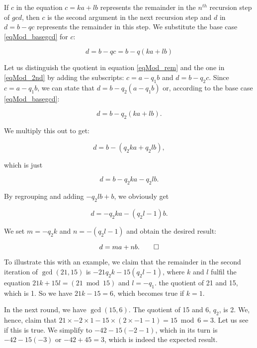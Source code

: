 \documentclass{scrreprt}
\begin{document}
If $c$ in the equation $c = ka + lb$
represents the remainder in the $n^{th}$ 
recursion step of $gcd$, then $c$
is the second argument in the next 
recursion step and $d$ in $d = b - qc$
represents the remainder in this step.
We substitute the base case 
\ref{eqMod_basegcd} for $c$:

\begin{equation}\label{eqMod_2nd}
d = b - qc = b - q(ka + lb)
\end{equation} 

Let us distinguish the quotient in equation \ref{eqMod_rem}
and the one in \ref{eqMod_2nd} by adding the subscripts:
$c = a - q_1b$ and $d = b - q_2c$.
Since $c = a - q_1b$, we can state that $d = b - q_2(a - q_1b)$
or, according to the base case \ref{eqMod_basegcd}: 

\begin{equation}
d = b - q_2(ka + lb).
\end{equation}

We multiply this out to get:

\begin{equation}
d = b - (q_2ka + q_2lb),
\end{equation}

which is just

\begin{equation}
d = b - q_2ka - q_2lb.
\end{equation}

By regrouping and adding $-q_2lb + b$, we obviously get

\begin{equation}\label{eqMod_mandn}
d = -q_2ka - (q_2l-1)b.
\end{equation}

We set $m = -q_2k$ and $n = -(q_2l-1)$
and obtain the desired result:

\begin{equation}
d = ma + nb.\qed
\end{equation}

To illustrate this with an example,
we claim that the remainder in the second 
iteration of $\gcd(21,15)$ is
$-21q_2k - 15(q_2l - 1)$,
where $k$ and $l$ fulfil the equation
$21k + 15l = (21 \bmod 15)$ and $l = -q_1$.
the quotient of 21 and 15, which is 1.
So we have
$21k - 15 = 6$, which becomes true if $k=1$.

In the next round, we have $\gcd(15,6)$.
The quotient of 15 and 6, $q_2$, is 2.
We, hence, claim that
$21 \times -2 \times 1 - 15 \times (2 \times -1  - 1) = 15 \bmod 6 = 3$. 
Let us see if this is true. We simplify to
$-42 - 15(-2 - 1)$, which in its turn is
$-42 - 15(-3)$ or $-42 + 45 = 3$,
which is indeed the expected result.
\end{document}
